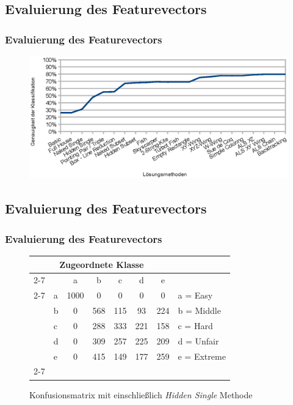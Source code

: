 \documentclass[accentcolor=tud6b,colorbacktitle,inverttitle,landscape,german,presentation,t]{tudbeamer}
\begin{document}
	\subsection{Evaluierung des Featurevectors}
		\begin{frame}
		\frametitle{Evaluierung des Featurevectors}
		\begin{figure}[Hh]
		\includegraphics[width=\textwidth,height=\textheight,keepaspectratio]{./img/accuracy.eps}
		\end{figure}
		\end{frame}

	\subsection{Evaluierung des Featurevectors}
		\begin{frame}
		\frametitle{Evaluierung des Featurevectors}
		\begin{figure}[Hh]
		\centering
		\begin{tabular}{ l | l |  c  c  c  c  c | l}
		\multicolumn{7}{c}{\textbf{Zugeordnete Klasse}}\\
		\cline{2-7}
		\multirow{6}{*}{\begin{turn}{90}\textbf{Klasse}\end{turn}}
		 &  & a & b & c & d & e\\
		\cline{2-7}
		& a & 1000 & 0 & 0 & 0 & 0 & a = Easy \\
		& b & 0 & 568 & 115 & 93 & 224 & b = Middle \\
		& c & 0 & 288 & 333 & 221 & 158 & c = Hard \\
		& d & 0 & 309 & 257 & 225 & 209 & d = Unfair \\
		& e & 0 & 415 & 149 & 177 & 259 & e = Extreme \\
		\cline{2-7}
		\end{tabular}
		\caption{Konfusionsmatrix mit einschließlich \textit{Hidden Single} Methode}
		\end{figure}
		\end{frame}
\end{document}

